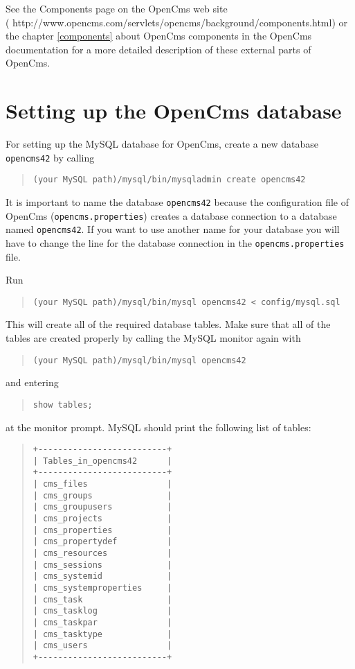 See the Components page on the OpenCms web site \\
(
{http://www.opencms.com/servlets/opencms/background/components.html}) 
or the chapter \ref{components} about OpenCms components in the OpenCms documentation 
for a more detailed description of these external parts of OpenCms.


\section{\label{42dbsetup}Setting up the OpenCms database}
For setting up the MySQL database for OpenCms, create a new database \texttt{opencms42}
by calling

\begin{quote}
\texttt{(your MySQL path)/mysql/bin/mysqladmin create opencms42}
\end{quote}

It is important to name the database \texttt{opencms42} because the configuration file of
OpenCms (\texttt{opencms.properties}) creates a database connection to a database named \texttt{opencms42}.
If you want to use another name for your database
you will have to change the line for the database connection in the \texttt{opencms.properties} file.

Run
\begin{quote}
\texttt{(your MySQL path)/mysql/bin/mysql opencms42 < config/mysql.sql}
\end{quote}
This will create all of the required database tables. 
Make sure that all of the tables are created properly by calling the MySQL monitor again with

\begin{quote}
\texttt{(your MySQL path)/mysql/bin/mysql opencms42}
\end{quote}

and entering 
\begin{quote}
\texttt{show tables;}
\end{quote}
at the monitor prompt. MySQL should print the following list of tables: 

\begin{quote}
\begin{verbatim}
+--------------------------+
| Tables_in_opencms42      |
+--------------------------+
| cms_files                |
| cms_groups               |
| cms_groupusers           |
| cms_projects             |
| cms_properties           |
| cms_propertydef          |
| cms_resources            |
| cms_sessions             |
| cms_systemid             |
| cms_systemproperties     |
| cms_task                 |
| cms_tasklog              |
| cms_taskpar              |
| cms_tasktype             |
| cms_users                |
+--------------------------+
\end{verbatim}
\end{quote}


